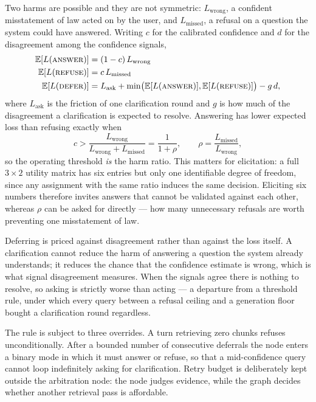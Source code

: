 \documentclass[conference]{IEEEtran}
\begin{document}
Two harms are possible and they are not symmetric: $L_{\text{wrong}}$, a
confident misstatement of law acted on by the user, and $L_{\text{missed}}$, a
refusal on a question the system could have answered. Writing $c$ for the
calibrated confidence and $d$ for the disagreement among the confidence signals,
\begin{equation}
\begin{aligned}
\mathbb{E}[L(\textsc{answer})] &= (1-c)\,L_{\text{wrong}}\\
\mathbb{E}[L(\textsc{refuse})] &= c\,L_{\text{missed}}\\
\mathbb{E}[L(\textsc{defer})]  &= L_{\text{ask}}
   + \min\bigl(\mathbb{E}[L(\textsc{answer})],\mathbb{E}[L(\textsc{refuse})]\bigr)
   - g\,d,
\end{aligned}
\label{eq:losses}
\end{equation}
where $L_{\text{ask}}$ is the friction of one clarification round and $g$ is how
much of the disagreement a clarification is expected to resolve. Answering has
lower expected loss than refusing exactly when
\begin{equation}
c > \frac{L_{\text{wrong}}}{L_{\text{wrong}} + L_{\text{missed}}}
  = \frac{1}{1+\rho},
\qquad \rho = \frac{L_{\text{missed}}}{L_{\text{wrong}}},
\label{eq:boundary}
\end{equation}
so the operating threshold \emph{is} the harm ratio. This matters for
elicitation: a full $3\times2$ utility matrix has six entries but only one
identifiable degree of freedom, since any assignment with the same ratio induces
the same decision. Eliciting six numbers therefore invites answers that cannot
be validated against each other, whereas $\rho$ can be asked for directly ---
how many unnecessary refusals are worth preventing one misstatement of law.

Deferring is priced against disagreement rather than against the loss itself. A
clarification cannot reduce the harm of answering a question the system already
understands; it reduces the chance that the confidence estimate is wrong, which
is what signal disagreement measures. When the signals agree there is nothing to
resolve, so asking is strictly worse than acting --- a departure from a
threshold rule, under which every query between a refusal ceiling and a
generation floor bought a clarification round regardless.

The rule is subject to three overrides. A turn retrieving zero chunks refuses
unconditionally. After a bounded number of consecutive deferrals the node enters
a binary mode in which it must answer or refuse, so that a mid-confidence query
cannot loop indefinitely asking for clarification. Retry budget is deliberately
kept outside the arbitration node: the node judges evidence, while the graph
decides whether another retrieval pass is affordable.
\end{document}

